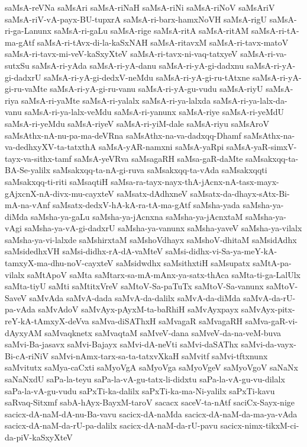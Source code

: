 {saMsA-reVNa
saMsAri
saMsA-riNaH
saMsA-riNi
saMsA-riNoV
saMsAriV
saMsA-riV-vA-payx-BU-tupxrA
saMsA-ri-barx-hamxNoVH
saMsA-rigU
saMsA-ri-ga-Lanunx
saMsA-ri-gaLu
saMsA-rige
saMsA-ritA
saMsA-ritAM
saMsA-ri-tA-ma-gAtf
saMsA-ri-tAvx-di-la-kaSxNAH
saMsA-ritavxM
saMsA-ri-tavx-matoV
saMsA-ri-tavx-mi-veV-kaSxyXteV
saMsA-ri-tavx-ni-vaq-tatxyeV
saMsA-ri-va-sutxSu
saMsA-ri-yAda
saMsA-ri-yA-danu
saMsA-ri-yA-gi-dadxnu
saMsA-ri-yA-gi-dadxrU
saMsA-ri-yA-gi-dedxV-neMdu
saMsA-ri-yA-gi-ru-tAtxne
saMsA-ri-yA-gi-ru-vaMte
saMsA-ri-yA-gi-ru-vanu
saMsA-ri-yA-gu-vudu
saMsA-riyU
saMsA-riya
saMsA-ri-yaMte
saMsA-ri-yalalx
saMsA-ri-ya-lalxda
saMsA-ri-ya-lalx-da-vanu
saMsA-ri-ya-lalx-veMdu
saMsA-ri-yanunx
saMsA-riye
saMsA-ri-yeMdU
saMsA-ri-yeMdu
saMsA-riyeV
saMsA-ri-yiM-dale
saMsA-riyu
saMsAroV
saMsAthx-nA-nu-pa-ma-deVRna
saMsAthx-na-va-dadxqq-Dhamf
saMsAthx-na-va-dedhxyXV-ta-tatxthA
saMsA-yAR-namxni
saMsA-yaRpi
saMsA-yaR-simxV-tayx-va-sithx-tamf
saMsA-yeVRva
saMsagaRH
saMsa-gaR-daMte
saMsakxqq-ta-BA-Se-yalilx
saMsakxqq-ta-nA-gi-ruva
saMsakxqq-ta-vAda
saMsakxqqti
saMsakxqq-ti-riti
saMsaqtiH
saMsa-ra-tayx-nayx-thA-jAcnx-nA-tasx-mayx-gAjxcnX-nA-divx-mu-cayxteV
saMsatx-dAdhxneV
saMsatx-da-dhayx-sAtx-Bi-mA-na-vAnf
saMsatx-dedxV-hA-kA-ra-tA-ma-gAtf
saMsha-yada
saMsha-ya-diMda
saMsha-ya-gaLu
saMsha-ya-jAcnxna
saMsha-ya-jAcnxtaM
saMsha-ya-vAgi
saMsha-ya-vA-gi-dadxrU
saMsha-ya-vanunx
saMsha-yaveV
saMsha-ya-vilalx
saMsha-ya-vi-lalxde
saMshirxtaM
saMshoVdhayx
saMshoV-dhitaM
saMsidAdhx
saMsidedhxVH
saMsi-didhx-rA-dA-vaMteV
saMsi-didhx-vi-Sa-ya-meY-kA-tamxyX-ma-dhu-noV-cayxteV
saMsidwdhx
saMsithxtiH
saMsupatx
saMtA-pa-vilalx
saMtApoV
saMta
saMtarx-sa-mA-mAnx-ya-satx-thAca
saMta-ti-ga-LalUlx
saMta-tiyU
saMti
saMtitxVreV
saMtoV-Sa-paTuTx
saMtoV-Sa-vanunx
saMtoV-SaveV
saMvAda
saMvA-dada
saMvA-da-dalilx
saMvA-da-diMda
saMvA-da-rU-pa-vAda
saMvAdoV
saMvAyx-pAyxM-ta-baRhiH
saMvAyxpayx
saMvAyx-pitx-reY-kA-tAmxyX-deVva
saMva-diSAThxH
saMvagaR
saMvagaRH
saMva-gaR-vi-dAyxyAM
saMvaqknetx
saMvaqtaM
saMveV-dana
saMveV-da-na-veM-buva
saMvi-Ba-jasavx
saMvi-Bajayx
saMvi-dA-neVti
saMvi-daSAThx
saMvi-da-vayx-Bi-cA-riNiV
saMvi-nAmx-tarx-sa-ta-tatxvXkaH
saMvitf
saMvi-tftxnunx
saMvitutx
saMya-caCxti
saMyoVgA
saMyoVga
saMyoVgeV
saMyoVgoV
saNaNx
saNaNxdU
saPa-la-teyu
saPa-la-vA-gu-tatx-li-didxtu
saPa-la-vA-gu-vu-dilalx
saPa-la-vA-gu-vudu
saPxTi-ka-dalilx
saPxTi-ka-ma-Ni-yalilx
saPxTi-kavu
saRvaq-Sitxmf
sabA-hAyx-BayxM-taroV
sacacx
saceV-ta-nAtf
saciCx-Sayx-nige
sacicx-dA-naM-dA-nu-Ba-vavu
sacicx-dA-naMda
sacicx-dA-naM-da-ma-ya-vAda
sacicx-dA-naM-da-rU-pa-dalilx
sacicx-dA-naM-da-rU-pavu
sacicx-nimx-tikxM-ci-da-piV-kaSxyXteV
}
